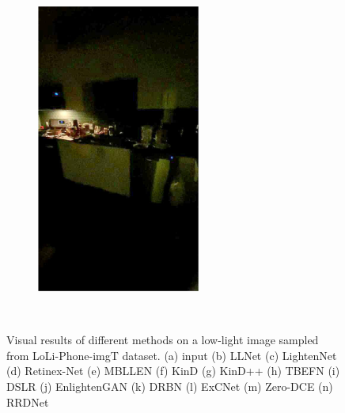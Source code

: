 \documentclass[letterpaper,12pt]{article}
\begin{document}
\begin{figure}[htbp]
\begin{subfigure}{0.128\textwidth}
			\includegraphics[width=\linewidth]{LoLi-Phone-imgT/RRDNet}
			\captionsetup{font=scriptsize}
			\caption{}
			\label{fig: LoLi-Phone-imgT_n}  
		\end{subfigure}\\
		
		\captionsetup{font=scriptsize}
		\caption{
			\label{fig: Visual Result from LoLi-Phone-imgT dataset}
			Visual results of different methods on a low-light image sampled from LoLi-Phone-imgT dataset. (a) input (b) LLNet (c) LightenNet (d) Retinex-Net (e) MBLLEN  (f) KinD  (g) KinD++  (h) TBEFN  (i) DSLR  (j) EnlightenGAN  (k) DRBN  (l) ExCNet  (m) Zero-DCE  (n) RRDNet 
		}
	\end{figure}
	
\end{document}
